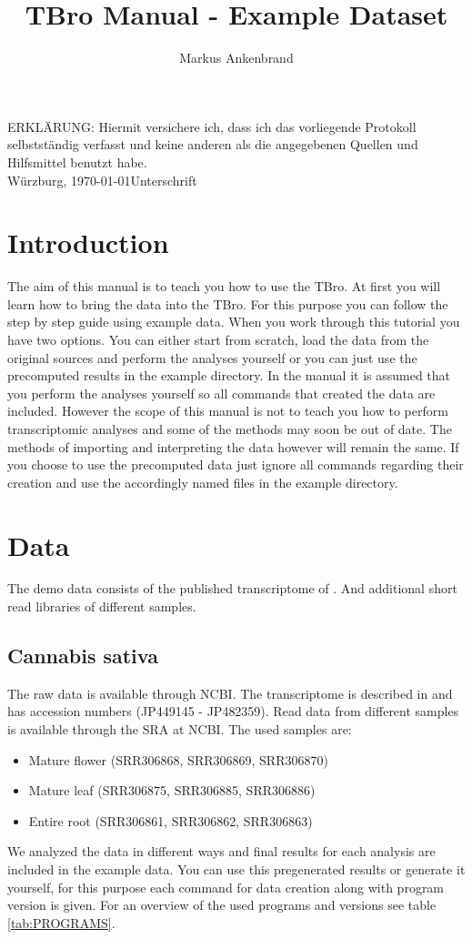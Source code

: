 \documentclass[english]{scrartcl}
\begin{document}
\title{TBro Manual - Example Dataset}
\author{Markus Ankenbrand}
\maketitle

ERKL\"ARUNG: Hiermit versichere ich, dass ich das vorliegende Protokoll
selbst\-st\"an\-dig verfasst und keine anderen als die angegebenen Quellen und
Hilfsmittel benutzt habe.\\[2cm]

W\"urzburg, \today \hfill Unterschrift

\newpage
\section{Introduction}
The aim of this manual is to teach you how to use the TBro. At first you will
learn how to bring the data into the TBro. For this purpose you can follow the
step by step guide using example data. When you work through this tutorial you
have two options. You can either start from scratch, load the data from the
original sources and perform the analyses yourself or you can just use the
precomputed results in the example directory. In the manual it is assumed that
you perform the analyses yourself so all commands that created the data are
included. However the scope of this manual is not to teach you how to perform
transcriptomic analyses and some of the methods may soon be out of date. The
methods of importing and interpreting the data however will remain the same. If
you choose to use the precomputed data just ignore all commands regarding their
creation and use the accordingly named files in the example directory.

\section{Data}
The demo data consists of the published transcriptome of . And
additional short read libraries of different samples.

\subsection{Cannabis sativa}
The raw data is available through NCBI. The transcriptome is described
in \cite{CSATIVA} and has accession numbers (JP449145 - JP482359). Read data
from different samples is available through the SRA at NCBI. The used samples
are:
\begin{itemize}
\item Mature flower (SRR306868, SRR306869, SRR306870)
\item Mature leaf (SRR306875, SRR306885, SRR306886)
\item Entire root (SRR306861, SRR306862, SRR306863)
\end{itemize}
We analyzed the data in different ways and final results for each
analysis are included in the example data. You can use this pregenerated results
or generate it yourself, for this purpose each command for data creation along
with program version is given. For an overview of the used programs and versions
see table \ref{tab:PROGRAMS}.
\end{document}
